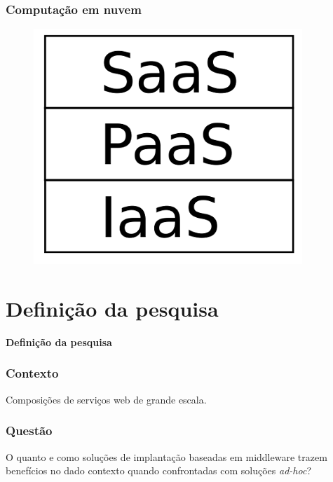 \documentclass{beamer}
\newcommand\adhoc{\emph{ad-hoc}\xspace}
\newcommand\sectiontitle[1]{\begin{center}\huge\textbf{#1}\end{center}}
\newcommand\frase[1]{\begin{center}\large#1\end{center}}
\begin{document}

\begin{frame}
\frametitle{Computação em nuvem}

\begin{figure}
\includegraphics[width=0.5\linewidth]{img/cloud}
\end{figure}

\end{frame}


\section{Definição da pesquisa}

\begin{frame}

\sectiontitle{Definição da pesquisa}

\end{frame}


\begin{frame}
\frametitle{Contexto}

\frase{Composições de serviços web de grande escala.}

\end{frame}

\begin{frame}
\frametitle{Questão}

\frase{O quanto e como soluções de implantação baseadas em middleware  
trazem benefícios no dado contexto
quando confrontadas com soluções \adhoc?}

\end{frame}

\end{document}
